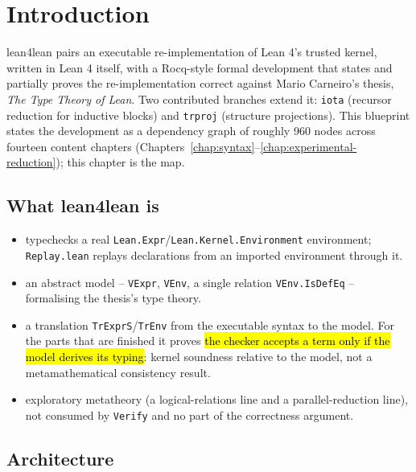 \chapter{Introduction}
\label{chap:intro}

lean4lean pairs an executable re-implementation of Lean 4's trusted kernel, written in Lean 4
itself, with a Rocq-style formal development that states and partially proves the
re-implementation correct against Mario Carneiro's thesis, \emph{The Type Theory of Lean}. Two
contributed branches extend it:
\texttt{iota} (recursor reduction for inductive blocks) and \texttt{trproj} (structure
projections). This blueprint states the development as a dependency graph of roughly 960 nodes
across fourteen content chapters (Chapters~\ref{chap:syntax}--\ref{chap:experimental-reduction});
this chapter is the map.

\section{What lean4lean is}

\begin{itemize}
\item {} typechecks a real \texttt{Lean.Expr}/\texttt{Lean.Kernel.Environment}
environment; \texttt{Replay.lean} replays declarations from an imported environment through it.
\item {} an abstract model -- \texttt{VExpr}, \texttt{VEnv}, a single relation
\texttt{VEnv.IsDefEq} -- formalising the thesis's type theory.
\item {} a translation \texttt{TrExprS}/\texttt{TrEnv} from the executable syntax to the
model. For the parts that are finished it proves \hl{the checker accepts a term only if the model
derives its typing}: kernel soundness relative to the model, not a metamathematical consistency
result.
\item {} exploratory metatheory (a logical-relations line and a
parallel-reduction line), not consumed by \texttt{Verify} and no part of the correctness argument.
\end{itemize}

\section{Architecture}

